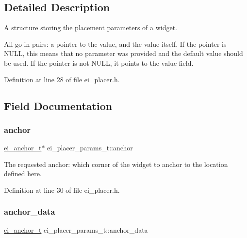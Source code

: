 \subsection{Detailed Description}
A structure storing the placement parameters of a widget. 

All go in pairs\+: a pointer to the value, and the value itself. If the pointer is N\+U\+LL, this means that no parameter was provided and the default value should be used. If the pointer is not N\+U\+LL, it points to the value field. 

Definition at line 28 of file ei\+\_\+placer.\+h.



\subsection{Field Documentation}
\mbox{\label{structei__placer__params__t_ada4443b28a68ad51ab28667dbe23902c}} 
\subsubsection{\texorpdfstring{anchor}{anchor}}
{\footnotesize\ttfamily \hyperlink{ei__types_8h_a3852c963af609d31d7cfcff79c4c8450}{ei\+\_\+anchor\+\_\+t}$\ast$ ei\+\_\+placer\+\_\+params\+\_\+t\+::anchor}



The requested anchor\+: which corner of the widget to anchor to the location defined here. 



Definition at line 30 of file ei\+\_\+placer.\+h.

\mbox{\label{structei__placer__params__t_a8351a31ff125a983c8640c93699309dd}} 
\subsubsection{\texorpdfstring{anchor\+\_\+data}{anchor\_data}}
{\footnotesize\ttfamily \hyperlink{ei__types_8h_a3852c963af609d31d7cfcff79c4c8450}{ei\+\_\+anchor\+\_\+t} ei\+\_\+placer\+\_\+params\+\_\+t\+::anchor\+\_\+data}



